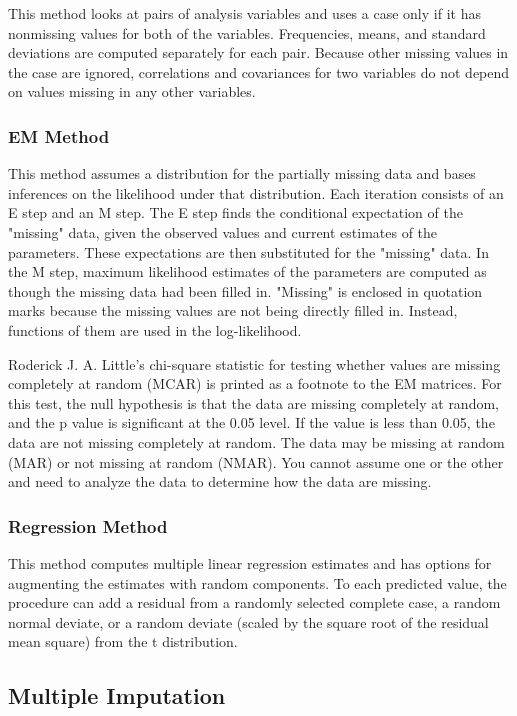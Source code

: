 This method looks at pairs of analysis variables and uses a case only if it has nonmissing values for both of the variables. Frequencies, means, and standard deviations are computed separately for each pair. Because other missing values in the case are ignored, correlations and covariances for two variables do not depend on values missing in any other variables.

\subsubsection*{EM Method}

This method assumes a distribution for the partially missing data and bases inferences on the likelihood under that distribution. Each iteration consists of an E step and an M step. The E step finds the conditional expectation of the "missing" data, given the observed values and current estimates of the parameters. These expectations are then substituted for the "missing" data. In the M step, maximum likelihood estimates of the parameters are computed as though the missing data had been filled in. "Missing" is enclosed in quotation marks because the missing values are not being directly filled in. Instead, functions of them are used in the log-likelihood.

Roderick J. A. Little's chi-square statistic for testing whether values are missing completely at random (MCAR) is printed as a footnote to the EM matrices. For this test, the null hypothesis is that the data are missing completely at random, and the p value is significant at the 0.05 level. If the value is less than 0.05, the data are not missing completely at random. The data may be missing at random (MAR) or not missing at random (NMAR). You cannot assume one or the other and need to analyze the data to determine how the data are missing.

\subsubsection*{Regression Method}

This method computes multiple linear regression estimates and has options for augmenting the estimates with random components. To each predicted value, the procedure can add a residual from a randomly selected complete case, a random normal deviate, or a random deviate (scaled by the square root of the residual mean square) from the t distribution.
\subsection{Multiple Imputation}

